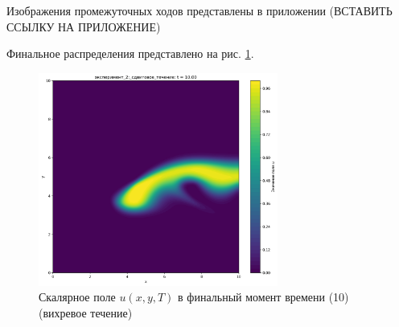Изображения промежуточных ходов представлены в приложении (ВСТАВИТЬ ССЫЛКУ НА ПРИЛОЖЕНИЕ)

Финальное распределения представлено на рис. \ref{fig:shear_final}.

\begin{figure}
	\centering
	\includegraphics[width=0.7\textwidth]{imgs/эксперимент_2:_сдвиговое_течение_t10.00.png}
	\caption{Скалярное поле \(u(x,y,T)\) в финальный момент времени (10) (вихревое течение)}
	\label{fig:shear_final}
\end{figure}
\newpage
